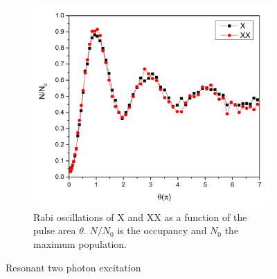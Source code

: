 \begin{figure}[H]
\begin{subfigure}[b]{0.48\textwidth}
		\centering
		\includegraphics[width=\textwidth]{figures/quantum-dot/Rabi_Oscillations_rel.png}
		\caption{Rabi oscillations of \ac{X} and \ac{XX} as a function of the pulse area $\theta$.
				$N/N_0$ is the occupancy and $N_0$ the maximum population.}
		\label{fig:rabi-oscillations}
	\end{subfigure}
	\caption{Resonant two photon excitation~\cite{schimpf_towards_2017}}
	\label{fig:resonant-two-photon-excitation}
\end{figure}
